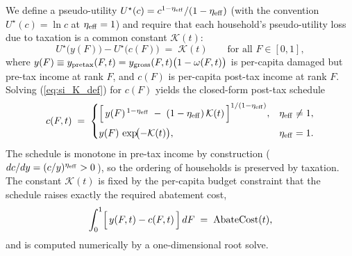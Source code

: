 We define a pseudo-utility $U^{\star}(c) = c^{1-\eta_{\rm eff}}/(1-\eta_{\rm eff})$ (with the convention $U^{\star}(c) = \ln c$ at $\eta_{\rm eff} = 1$) and require that each household's pseudo-utility loss due to taxation is a common constant $\mathcal{K}(t)$:
\begin{equation}\label{eq:si_K_def}
U^{\star}\!\bigl(y(F)\bigr) - U^{\star}\!\bigl(c(F)\bigr) \;=\; \mathcal{K}(t)
\qquad \text{for all } F \in [0,1],
\end{equation}
where $y(F) \equiv y_{\rm pretax}(F,t) = y_{\rm gross}(F,t)\bigl(1 - \omega(F,t)\bigr)$ is per-capita damaged but pre-tax income at rank $F$, and $c(F)$ is per-capita post-tax income at rank $F$.  Solving (\ref{eq:si_K_def}) for $c(F)$ yields the closed-form post-tax schedule
\begin{equation}\label{eq:si_post_tax}
c(F, t) \;=\;
\begin{cases}
\Bigl[\, y(F)^{\,1-\eta_{\rm eff}} \;-\; (1-\eta_{\rm eff})\, \mathcal{K}(t) \,\Bigr]^{1/(1-\eta_{\rm eff})}, & \eta_{\rm eff} \ne 1, \\[6pt]
y(F)\,\exp\!\bigl(-\mathcal{K}(t)\bigr), & \eta_{\rm eff} = 1.
\end{cases}
\end{equation}
The schedule is monotone in pre-tax income by construction (\,$dc/dy = (c/y)^{\eta_{\rm eff}} > 0$\,), so the ordering of households is preserved by taxation.  The constant $\mathcal{K}(t)$ is fixed by the per-capita budget constraint that the schedule raises exactly the required abatement cost,
\begin{equation}\label{eq:si_budget}
\int_{0}^{1} \Bigl[\, y(F, t) - c(F, t) \,\Bigr]\, dF \;=\; \mathrm{AbateCost}(t), %
\end{equation}
and is computed numerically by a one-dimensional root solve.

